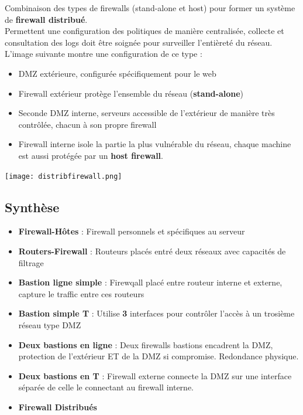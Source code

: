 \documentclass{report}
\begin{document}
			Combinaison des types de firewalls (stand-alone et host) pour former un système de \textbf{firewall distribué}.\\
			Permettent une configuration des politiques de manière centralisée, collecte et consultation des logs doit être soignée pour surveiller l'entièreté du réseau.\\

			L'image suivante montre une configuration de ce type : \\

			\begin{itemize}
				\item DMZ extérieure, configurée spécifiquement pour le web
				\item Firewall extérieur protège l'ensemble du réseau (\textbf{stand-alone})
				\item Seconde DMZ interne, serveurs accessible de l'extérieur de manière très contrôlée, chacun à son propre firewall
				\item Firewall interne isole la partie la plus vulnérable du réseau, chaque machine est aussi protégée par un \textbf{host firewall}.\\
			\end{itemize}

			\texttt{[image: distribfirewall.png]}\\

		\subsection{Synthèse}

			\begin{itemize}
				\item \textbf{Firewall-Hôtes} : Firewall personnels et spécifiques au serveur
				\item \textbf{Routers-Firewall} : Routeurs placés entré deux réseaux avec capacités de filtrage
				\item \textbf{Bastion ligne simple} : Firewqall placé entre routeur interne et externe, capture le traffic entre ces routeurs
				\item \textbf{Bastion simple T} : Utilise \textbf{3} interfaces pour contrôler l'accès à un trosième réseau type DMZ
				\item \textbf{Deux bastions en ligne} : Deux firewalls bastions encadrent la DMZ, protection de l'extérieur ET de la DMZ si compromise. Redondance physique.\\
				\item \textbf{Deux bastions en T} : Firewall externe connecte la DMZ sur une interface séparée de celle le connectant au firewall interne.\\
				\item \textbf{Firewall Distribués}\\
			\end{itemize}
\end{document}
